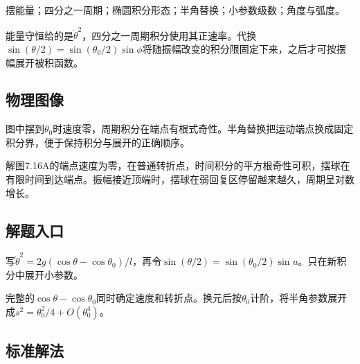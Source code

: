 \documentclass[UTF8,fontset=fandol,a4paper,11pt]{ctexart}
\begin{document}
摆能量；四分之一周期；椭圆积分形态；半角替换；小参数级数；角度与弧度。

能量守恒给的是$\dot\theta^2$，四分之一周期积分使用其正速率。代换$\sin(\theta/2)=\sin(\theta_0/2)\sin\phi$将随振幅改变的积分限固定下来，之后才可按摆幅展开被积函数。




\subsection*{物理图像}

图中摆到\(\theta _{0}\)时速度零，周期积分在端点有根式奇性。半角替换把运动端点换成固定积分界，便于保持积分与展开的正确顺序。

解图7.16A的端点速度为零，在普通转折点，时间积分的平方根奇性可积，摆球在有限时间到达端点。振幅接近顶端时，摆球在弱回复区停留越来越久，周期呈对数增长。




\subsection*{解题入口}

写\(\dot\theta^2=2g(\cos\theta-\cos\theta_0)/l\)，再令\(\sin(\theta/2)=\sin(\theta_0/2)\sin u\)。只在新积分中展开小参数。

完整的$\cos\theta-\cos\theta_0$同时确定速度和转折点。换元后按$\theta_0$计阶，将半角参数展开成$s^2=\theta_0^2/4+O(\theta_0^4)$。





\subsection*{标准解法}
\end{document}
